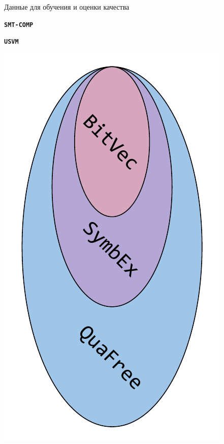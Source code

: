 \documentclass[14pt,aspectratio=169,hyperref={pdftex,unicode},xcolor=dvipsnames]{beamer}
\begin{document}
\begin{frame}{Данные для обучения и оценки качества}

\begin{minipage}{0.5\textwidth}

\textbf{\texttt{SMT-COMP}} \cite{smt-comp-2023-benchmarks}

\end{minipage}%
\begin{minipage}{0.5\textwidth}

\textbf{\texttt{USVM}} \cite{usvm-github} \cite{usvm-diploma}

\end{minipage}

\begin{minipage}{0.5\textwidth}

\begin{center}
  \includegraphics[scale=0.45]{./assets/smt-comp-datasets.pdf}
\end{center}


\end{minipage}
\end{frame}
\end{document}
